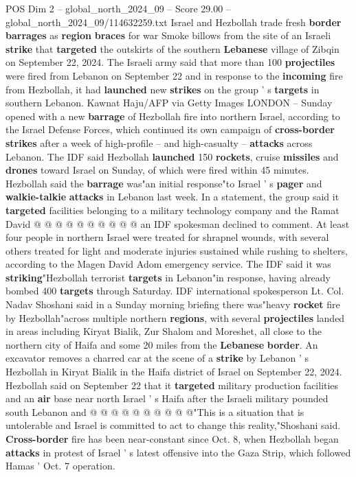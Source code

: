 \begin{textsample}{POS Dim 2 – global\_north\_2024\_09 – Score 29.00 – global\_north\_2024\_09/114632259.txt}  \label{ex:f2_pos_128}
Israel and Hezbollah trade fresh \textbf{border} \textbf{barrages} as \textbf{region} \textbf{braces} for war Smoke billows from the site of an Israeli \textbf{strike} that \textbf{targeted} the outskirts of the southern \textbf{Lebanese} village of Zibqin on September 22, 2024.
The Israeli army said that more than 100 \textbf{projectiles} were fired from Lebanon on September 22 and in response to the \textbf{incoming} fire from Hezbollah, it had \textbf{launched} new \textbf{strikes} on the group ' s \textbf{targets} in southern Lebanon.
Kawnat Haju/AFP via Getty Images LONDON -- Sunday opened with a new \textbf{barrage} of Hezbollah fire into northern Israel, according to the Israel Defense Forces, which continued its own campaign of \textbf{cross-border} \textbf{strikes} after a week of high-profile -- and high-casualty -- \textbf{attacks} across Lebanon.
The IDF said Hezbollah \textbf{launched} 150 \textbf{rockets}, cruise \textbf{missiles} and \textbf{drones} toward Israel on Sunday, of which were fired within 45 minutes.
Hezbollah said the \textbf{barrage} was"an initial response"to Israel ' s \textbf{pager} and \textbf{walkie-talkie} \textbf{attacks} in Lebanon last week.
In a statement, the group said it \textbf{targeted} facilities belonging to a military technology company and the Ramat David @ @ @ @ @ @ @ @ @ @ an IDF spokesman declined to comment.
At least four people in northern Israel were treated for shrapnel wounds, with several others treated for light and moderate injuries sustained while rushing to shelters, according to the Magen David Adom emergency service.
The IDF said it was \textbf{striking}"Hezbollah terrorist \textbf{targets} in Lebanon"in response, having already bombed 400 \textbf{targets} through Saturday.
IDF international spokesperson Lt.
Col.
Nadav Shoshani said in a Sunday morning briefing there was"heavy \textbf{rocket} fire by Hezbollah"across multiple northern \textbf{regions}, with several \textbf{projectiles} landed in areas including Kiryat Bialik, Zur Shalom and Moreshet, all close to the northern city of Haifa and some 20 miles from the \textbf{Lebanese} \textbf{border}.
An excavator removes a charred car at the scene of a \textbf{strike} by Lebanon ' s Hezbollah in Kiryat Bialik in the Haifa district of Israel on September 22, 2024.
Hezbollah said on September 22 that it \textbf{targeted} military production facilities and an \textbf{air} base near north Israel ' s Haifa after the Israeli military pounded south Lebanon and @ @ @ @ @ @ @ @ @ @"This is a situation that is untolerable and Israel is committed to act to change this reality,"Shoshani said. \textbf{Cross-border} fire has been near-constant since Oct. 8, when Hezbollah began \textbf{attacks} in protest of Israel ' s latest offensive into the Gaza Strip, which followed Hamas ' Oct. 7 operation.

\end{textsample}
